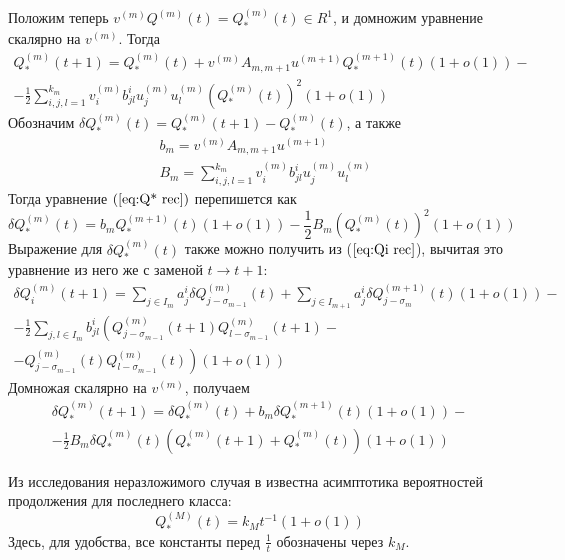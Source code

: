 \documentclass[12pt]{article}
\begin{document}
Положим теперь $v^{(m)} Q^{(m)}(t) = Q^{(m)}_*(t) \in R^1$, и домножим уравнение ска\-ляр\-но на $v^{(m)}$. Тогда
\begin{multline}
\label{eq:Q* rec}
	Q^{(m)}_*(t+1) = Q^{(m)}_*(t) + v^{(m)}A_{m,m+1}u^{(m+1)}Q^{(m+1)}_*(t)(1+o(1)) - \\
	- \frac{1}{2} \sum_{i,j,l = 1}^{k_m} v^{(m)}_i b^i_{jl} u^{(m)}_j u^{(m)}_l (Q^{(m)}_*(t))^2 (1+o(1))
\end{multline}
Обозначим $\delta Q^{(m)}_*(t) = Q^{(m)}_*(t+1) - Q^{(m)}_*(t)$, а также
\begin{align*}
	&b_m = v^{(m)} A_{m,m+1} u^{(m+1)} \\
	&B_m = \sum_{i,j,l = 1}^{k_m} v^{(m)}_i b^i_{jl} u^{(m)}_j u^{(m)}_l
\end{align*}
Тогда уравнение $(\ref{eq:Q* rec})$ перепишется как
\begin{equation}
\label{eq:dQ*_nonrec}
	\delta Q^{(m)}_*(t) = b_m Q^{(m+1)}_*(t)(1+o(1)) - \frac{1}{2} B_m (Q^{(m)}_*(t))^2(1+o(1))
\end{equation}
Выражение для $\delta Q^{(m)}_*(t)$ также можно получить из ($\ref{eq:Qi rec}$), вычитая это урав\-не\-ние из него же с заменой $t \rightarrow t+1$:
\begin{multline}
	\delta Q^{(m)}_i(t+1) = \sum_{j \in I_m} a^i_j \delta Q^{(m)}_{j-\sigma_{m-1}}(t) + \sum_{j \in I_{m+1}} a^i_j \delta Q^{(m+1)}_{j-\sigma_m}(t)(1+o(1)) - \\
	- \frac{1}{2} \sum_{j,l \in I_m} b^i_{jl} \left(Q^{(m)}_{j-\sigma_{m-1}}(t+1) Q^{(m)}_{l-\sigma_{m-1}}(t+1) - \right. \\
	\left. - Q^{(m)}_{j-\sigma_{m-1}}(t)Q^{(m)}_{l-\sigma_{m-1}}(t)\right)(1+o(1))
\end{multline}
Домножая скалярно на $v^{(m)}$, получаем
\begin{multline}
\label{eq:dQ* rec}
	\delta Q^{(m)}_*(t+1) = \delta Q^{(m)}_*(t) + b_m \delta Q^{(m+1)}_*(t)(1+o(1)) - \\
	- \frac{1}{2} B_m \delta Q^{(m)}_*(t) \left( Q^{(m)}_*(t+1) + Q^{(m)}_*(t) \right)(1+o(1))
\end{multline}

Из исследования неразложимого случая в \cite{lit:sev_vp} известна асимптотика ве\-ро\-ят\-нос\-тей продолжения для последнего класса:
\begin{equation}
	Q^{(M)}_*(t) = k_M t^{-1} (1+o(1))
\end{equation}
Здесь, для удобства, все константы перед $\frac{1}{t}$ обозначены через $k_M$.
\end{document}
